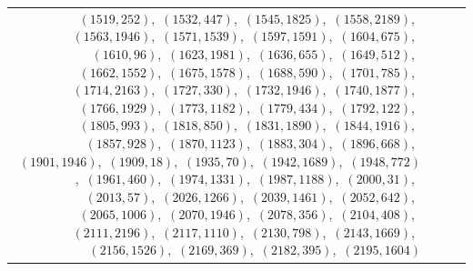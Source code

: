 \documentclass[11pt]{article}
\begin{document}
\begin{longtable}{@{}rrl>{\raggedright\arraybackslash}p{}@{}}
$(1519,252)$,\allowbreak\ $(1532,447)$,\allowbreak\ $(1545,1825)$,\allowbreak\ $(1558,2189)$,\allowbreak\ $(1563,1946)$,\allowbreak\ $(1571,1539)$,\allowbreak\ $(1597,1591)$,\allowbreak\ $(1604,675)$,\allowbreak\ $(1610,96)$,\allowbreak\ $(1623,1981)$,\allowbreak\ $(1636,655)$,\allowbreak\ $(1649,512)$,\allowbreak\ $(1662,1552)$,\allowbreak\ $(1675,1578)$,\allowbreak\ $(1688,590)$,\allowbreak\ $(1701,785)$,\allowbreak\ $(1714,2163)$,\allowbreak\ $(1727,330)$,\allowbreak\ $(1732,1946)$,\allowbreak\ $(1740,1877)$,\allowbreak\ $(1766,1929)$,\allowbreak\ $(1773,1182)$,\allowbreak\ $(1779,434)$,\allowbreak\ $(1792,122)$,\allowbreak\ $(1805,993)$,\allowbreak\ $(1818,850)$,\allowbreak\ $(1831,1890)$,\allowbreak\ $(1844,1916)$,\allowbreak\ $(1857,928)$,\allowbreak\ $(1870,1123)$,\allowbreak\ $(1883,304)$,\allowbreak\ $(1896,668)$,\allowbreak\ $(1901,1946)$,\allowbreak\ $(1909,18)$,\allowbreak\ $(1935,70)$,\allowbreak\ $(1942,1689)$,\allowbreak\ $(1948,772)$,\allowbreak\ $(1961,460)$,\allowbreak\ $(1974,1331)$,\allowbreak\ $(1987,1188)$,\allowbreak\ $(2000,31)$,\allowbreak\ $(2013,57)$,\allowbreak\ $(2026,1266)$,\allowbreak\ $(2039,1461)$,\allowbreak\ $(2052,642)$,\allowbreak\ $(2065,1006)$,\allowbreak\ $(2070,1946)$,\allowbreak\ $(2078,356)$,\allowbreak\ $(2104,408)$,\allowbreak\ $(2111,2196)$,\allowbreak\ $(2117,1110)$,\allowbreak\ $(2130,798)$,\allowbreak\ $(2143,1669)$,\allowbreak\ $(2156,1526)$,\allowbreak\ $(2169,369)$,\allowbreak\ $(2182,395)$,\allowbreak\ $(2195,1604)$\\

\end{longtable}
\end{document}
